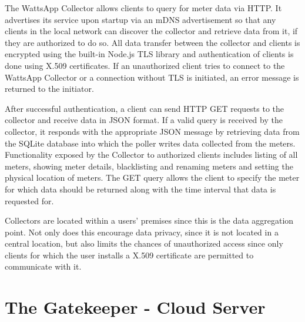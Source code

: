 \documentclass[10pt, conference, compsocconf, english]{IEEEtran}
\begin{document}
The WattsApp Collector allows clients to query for meter data via
HTTP. It advertises its service upon startup via an mDNS advertisement
so that any clients in the local network can discover the collector
and retrieve data from it, if they are authorized to do so. All data
transfer between the collector and clients is encrypted using the
built-in Node.js TLS library and authentication of clients is done
using X.509 certificates. If an unauthorized client tries to connect
to the WattsApp Collector or a connection without TLS is initiated,
an error message is returned to the initiator.

After successful authentication, a client can send HTTP GET requests
to the collector and receive data in JSON format. If a valid query
is received by the collector, it responds with the appropriate JSON
message by retrieving data from the SQLite database into which the
poller writes data collected from the meters. Functionality exposed
by the Collector to authorized clients includes listing of all meters,
showing meter details, blacklisting and renaming meters and setting
the physical location of meters. The GET query allows the client to
specify the meter for which data should be returned along with the
time interval that data is requested for.

Collectors are located within a users' premises since this is the
data aggregation point. Not only does this encourage data privacy,
since it is not located in a central location, but also limits the
chances of unauthorized access since only clients for which the user
installs a X.509 certificate are permitted to communicate with it.


\section{The Gatekeeper - Cloud Server}
\end{document}
